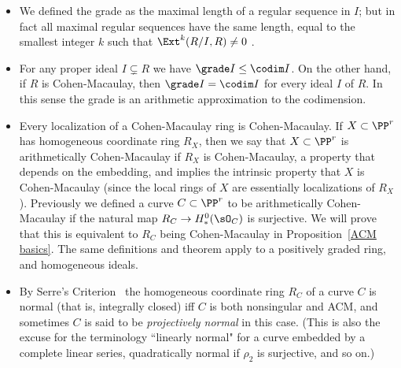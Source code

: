 \begin{fact} 
\begin{itemize}
 \item We defined the grade as the maximal length of a regular sequence in $I$; but in fact all maximal regular
sequences have the same length, equal to the smallest integer $k$ such that $\Ext^{k}(R/I,R)\neq 0$
\cite[Theorem 17.4 and Proposition 18.4]{Eisenbud1995}.

\item For any proper ideal $I\subsetneq R$ we have $\grade I \leq \codim I$. On the other hand, if $R$ is Cohen-Macaulay,
then $\grade I =\codim I$ for every ideal $I$ of $R$. In this sense the grade is an arithmetic
approximation to the codimension.

\item Every localization of a Cohen-Macaulay ring is Cohen-Macaulay. If $X\subset \PP^{r}$
has homogeneous coordinate ring $R_{X}$, then we say that $X\subset \PP^{r}$ is
arithmetically Cohen-Macaulay if $R_{X}$ is Cohen-Macaulay, a property that depends on the 
embedding, and implies the intrinsic property that $X$ is Cohen-Macaulay (since the local rings
of $X$ are essentially localizations of $R_{X}$). Previously we defined a curve $C\subset \PP^{r}$
to be arithmetically Cohen-Macaulay if the natural map $R_{C}\to H^{0}_{*}(\sO_{C})$ is surjective.
We will prove that this is equivalent to $R_{C}$ being Cohen-Macaulay in Proposition~\ref{ACM basics}. The same definitions and theorem apply to a positively graded ring, and homogeneous ideals. 

\item By Serre's Criterion~\cite[Section 11.2]{Eisenbud1995} the homogeneous coordinate ring $R_C$ of a curve $C$ is normal (that is, integrally closed) iff $C$ is both nonsingular and ACM, and sometimes $C$ is said to be \emph{projectively normal} in this case.  (This is also the excuse for the terminology ``linearly normal"
for a curve embedded by a complete linear series, quadratically normal if $\rho_{2}$ is surjective, and so on.)

\end{itemize}
 \end{fact}
 
